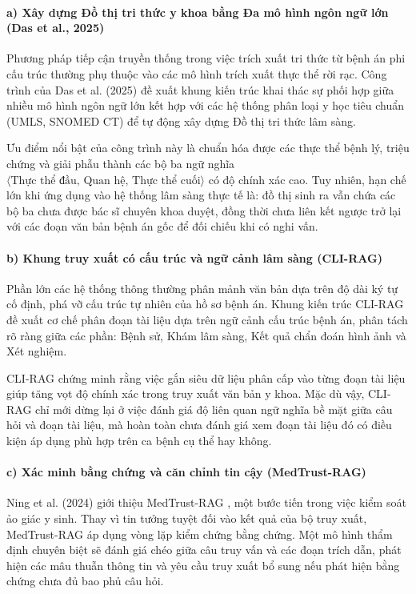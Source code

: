 \paragraph{a) Xây dựng Đồ thị tri thức y khoa bằng Đa mô hình ngôn ngữ lớn (Das et al., 2025)}
Phương pháp tiếp cận truyền thống trong việc trích xuất tri thức từ bệnh án phi cấu trúc thường phụ thuộc vào các mô hình trích xuất thực thể rời rạc. Công trình của Das et al. (2025) \cite{das2025clinicalkg} đề xuất khung kiến trúc khai thác sự phối hợp giữa nhiều mô hình ngôn ngữ lớn kết hợp với các hệ thống phân loại y học tiêu chuẩn (UMLS, SNOMED CT) để tự động xây dựng Đồ thị tri thức lâm sàng.

Ưu điểm nổi bật của công trình này là chuẩn hóa được các thực thể bệnh lý, triệu chứng và giải phẫu thành các bộ ba ngữ nghĩa $\langle \text{Thực thể đầu, Quan hệ, Thực thể cuối} \rangle$ có độ chính xác cao. Tuy nhiên, hạn chế lớn khi ứng dụng vào hệ thống lâm sàng thực tế là: đồ thị sinh ra vẫn chứa các bộ ba chưa được bác sĩ chuyên khoa duyệt, đồng thời chưa liên kết ngược trở lại với các đoạn văn bản bệnh án gốc để đối chiếu khi có nghi vấn.

\paragraph{b) Khung truy xuất có cấu trúc và ngữ cảnh lâm sàng (CLI-RAG)}
Phần lớn các hệ thống thông thường phân mảnh văn bản dựa trên độ dài ký tự cố định, phá vỡ cấu trúc tự nhiên của hồ sơ bệnh án. Khung kiến trúc CLI-RAG \cite{clirag2024} đề xuất cơ chế phân đoạn tài liệu dựa trên ngữ cảnh cấu trúc bệnh án, phân tách rõ ràng giữa các phần: Bệnh sử, Khám lâm sàng, Kết quả chẩn đoán hình ảnh và Xét nghiệm.

CLI-RAG chứng minh rằng việc gắn siêu dữ liệu phân cấp vào từng đoạn tài liệu giúp tăng vọt độ chính xác trong truy xuất văn bản y khoa. Mặc dù vậy, CLI-RAG chỉ mới dừng lại ở việc đánh giá độ liên quan ngữ nghĩa bề mặt giữa câu hỏi và đoạn tài liệu, mà hoàn toàn chưa đánh giá xem đoạn tài liệu đó có điều kiện áp dụng phù hợp trên ca bệnh cụ thể hay không.

\paragraph{c) Xác minh bằng chứng và căn chỉnh tin cậy (MedTrust-RAG)}
Ning et al. (2024) giới thiệu MedTrust-RAG \cite{medtrustrag}, một bước tiến trong việc kiểm soát ảo giác y sinh. Thay vì tin tưởng tuyệt đối vào kết quả của bộ truy xuất, MedTrust-RAG áp dụng vòng lặp kiểm chứng bằng chứng. Một mô hình thẩm định chuyên biệt sẽ đánh giá chéo giữa câu truy vấn và các đoạn trích dẫn, phát hiện các mâu thuẫn thông tin và yêu cầu truy xuất bổ sung nếu phát hiện bằng chứng chưa đủ bao phủ câu hỏi.


